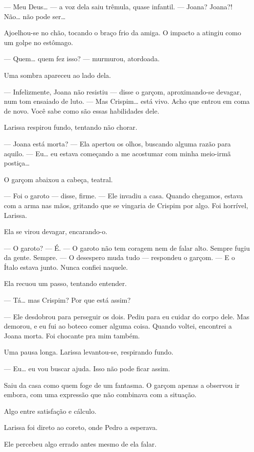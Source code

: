 — Meu Deus… — a voz dela saiu trêmula, quase infantil. — Joana? Joana?! Não… não pode ser…

Ajoelhou-se no chão, tocando o braço frio da amiga.  
O impacto a atingiu como um golpe no estômago.

— Quem… quem fez isso? — murmurou, atordoada.

Uma sombra apareceu ao lado dela.

— Infelizmente, Joana não resistiu — disse o garçom, aproximando-se devagar, num tom ensaiado de luto. — Mas Crispim… está vivo. Acho que entrou em coma de novo. Você sabe como são essas habilidades dele.

Larissa respirou fundo, tentando não chorar.

— Joana está morta? — Ela apertou os olhos, buscando alguma razão para aquilo. — Eu… eu estava começando a me acostumar com minha meio-irmã postiça…

O garçom abaixou a cabeça, teatral.

— Foi o garoto — disse, firme. — Ele invadiu a casa. Quando chegamos, estava com a arma nas mãos, gritando que se vingaria de Crispim por algo. Foi horrível, Larissa.

Ela se virou devagar, encarando-o.

— O garoto?  
— É.  
— O garoto não tem coragem nem de falar alto. Sempre fugiu da gente. Sempre.  
— O desespero muda tudo — respondeu o garçom. — E o Ítalo estava junto. Nunca confiei naquele.

Ela recuou um passo, tentando entender.

— Tá… mas Crispim? Por que está assim?

— Ele desdobrou para perseguir os dois. Pediu para eu cuidar do corpo dele. Mas demorou, e eu fui ao boteco comer alguma coisa. Quando voltei, encontrei a Joana morta. Foi chocante pra mim também.

Uma pausa longa.  
Larissa levantou-se, respirando fundo.

— Eu… eu vou buscar ajuda. Isso não pode ficar assim.

Saiu da casa como quem foge de um fantasma. O garçom apenas a observou ir embora, com uma expressão que não combinava com a situação.

Algo entre satisfação e cálculo.

\bigskip

Larissa foi direto ao coreto, onde Pedro a esperava.

Ele percebeu algo errado antes mesmo de ela falar.

